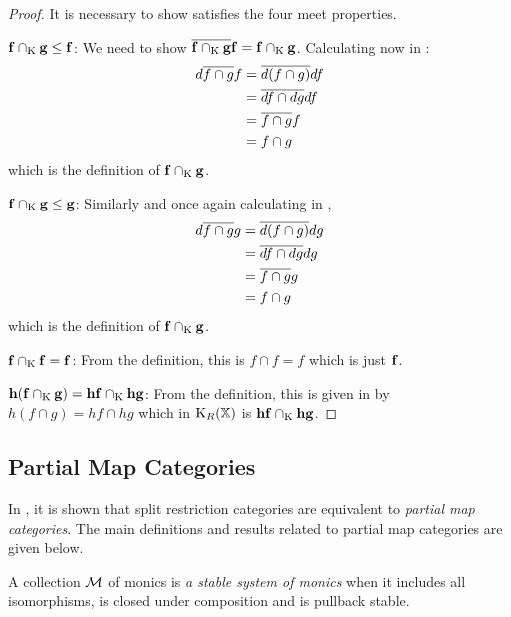 \begin{proof}
      It is necessary to show \capspl satisfies the four meet properties.
      \bi
        \item{$\mathbf{f}\cap_{\text{K}} \mathbf{g} \le \mathbf{f}$: } We need to show
          $\overline{\mathbf{f} \cap_{\text{K}} \mathbf{g}} \mathbf{f} =  \mathbf{f} \cap_{\text{K}} \mathbf{g}$.  Calculating now in \X:
          \begin{align*}
            d \overline{f \cap g} f&= \overline{d(f\cap g)} d f\\
            & = \overline{df \cap dg} df \\
            & = \overline{f \cap g} f \\
            & = f \cap g
          \end{align*}
          which is the definition of $\mathbf{f} \cap_{\text{K}} \mathbf{g}$.
        \item{$\mathbf{f}\cap_{\text{K}} \mathbf{g} \le \mathbf{g}$: } Similarly and once again calculating in \X,
          \begin{align*}
            d \overline{f \cap g} g&= \overline{d(f\cap g)} d g\\
            & = \overline{df \cap dg} dg \\
            & = \overline{f \cap g} g \\
            & = f \cap g
          \end{align*}
          which is the definition of $\mathbf{f} \cap_{\text{K}} \mathbf{g}$.
        \item{$\mathbf{f}\cap_{\text{K}} \mathbf{f} = \mathbf{f}$: } From the definition, this is $f \cap f = f$ which
          is just $ \mathbf{f}$.
        \item{$\mathbf{h}(\mathbf{f}\cap_{\text{K}} \mathbf{g}) = \mathbf{h}\mathbf{f} \cap_{\text{K}} \mathbf{h}\mathbf{g}$: }
          From the definition, this is given in \X by $ h (f \cap g) =
          h f \cap h g$ which in $\text{K}_{R}(\mathbb{X})$ is $\mathbf{h}\mathbf{f} \cap_{\text{K}} \mathbf{h}\mathbf{g}$.
      \ei
    \end{proof}



  \subsection{Partial Map Categories} %
    \label{sub:partial_map_categories}

    In \cite{cockett2002:restcategories1}, it is shown that split restriction categories are 
    equivalent to \emph{partial map categories}. The main definitions and results related to 
    partial map categories are given below.

    \begin{definition}
      A collection $\mathcal{M}$ of monics is \emph{a stable system of monics}
      when it includes all isomorphisms, is closed under composition and is
      pullback stable.
    \end{definition}


